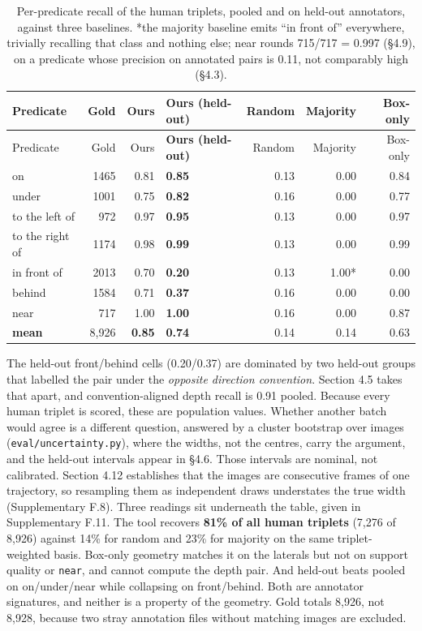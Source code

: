 \begin{center}
\setlength{\tabcolsep}{6pt}
\small
\begin{longtable}{lrrlrrr}
\caption[Per-predicate recall of the human triplets, pooled]{Per-predicate recall of the human triplets, pooled and on held-out annotators, against three baselines. *the majority baseline emits ``in front of'' everywhere, trivially recalling that class and nothing else; \textdagger{}near rounds 715/717 = 0.997 (\S{}4.9), on a predicate whose precision on annotated pairs is 0.11, not comparably high (\S{}4.3).}\\
\hline
Predicate & Gold & Ours & \textbf{Ours (held-out)} & Random & Majority & Box-only \\
\hline
\endfirsthead
\hline
Predicate & Gold & Ours & \textbf{Ours (held-out)} & Random & Majority & Box-only \\
\hline
\endhead
on & 1465 & 0.81 & \textbf{0.85} & 0.13 & 0.00 & 0.84 \\
under & 1001 & 0.75 & \textbf{0.82} & 0.16 & 0.00 & 0.77 \\
to the left of & 972 & 0.97 & \textbf{0.95} & 0.13 & 0.00 & 0.97 \\
to the right of & 1174 & 0.98 & \textbf{0.99} & 0.13 & 0.00 & 0.99 \\
in front of & 2013 & 0.70 & \textbf{0.20} & 0.13 & 1.00* & 0.00 \\
behind & 1584 & 0.71 & \textbf{0.37} & 0.16 & 0.00 & 0.00 \\
near & 717 & 1.00\textdagger{} & \textbf{1.00} & 0.16 & 0.00 & 0.87 \\
\textbf{mean} & 8,926 & \textbf{0.85} & \textbf{0.74} & 0.14 & 0.14 & 0.63 \\
\hline
\end{longtable}
\end{center}

The held-out front/behind cells (0.20/0.37) are dominated by two held-out groups that labelled the pair under the \textit{opposite direction convention}. Section 4.5 takes that apart, and convention-aligned depth recall is 0.91 pooled. Because every human triplet is scored, these are population values. Whether another batch would agree is a different question, answered by a cluster bootstrap over images (\texttt{eval/uncertainty.py}), where the widths, not the centres, carry the argument, and the held-out intervals appear in \S{}4.6. Those intervals are nominal, not calibrated. Section 4.12 establishes that the images are consecutive frames of one trajectory, so resampling them as independent draws understates the true width (Supplementary F.8). Three readings sit underneath the table, given in Supplementary F.11. The tool recovers \textbf{81\% of all human triplets} (7,276 of 8,926) against 14\% for random and 23\% for majority on the same triplet-weighted basis. Box-only geometry matches it on the laterals but not on support quality or \texttt{near}, and cannot compute the depth pair. And held-out beats pooled on on/under/near while collapsing on front/behind. Both are annotator signatures, and neither is a property of the geometry. Gold totals 8,926, not 8,928, because two stray annotation files without matching images are excluded.

